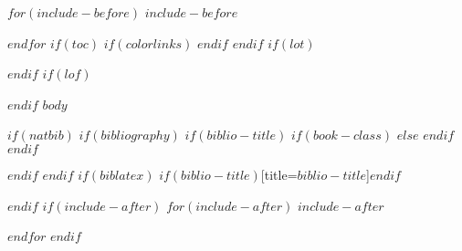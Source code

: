 \documentclass[$if(fontsize)$$fontsize$,$endif$$if(lang)$$babel-lang$,$endif$$if(papersize)$$papersize$,$endif$$for(classoption)$$classoption$$sep$,$endfor$]{$documentclass$}
\begin{document}
$for(include-before)$
$include-before$

$endfor$
$if(toc)$
{
$if(colorlinks)$
\hypersetup{linkcolor=$if(toccolor)$$toccolor$$else$black$endif$}
$endif$
\setcounter{tocdepth}{$toc-depth$}
\newpage
{}
\tableofcontents
}
$endif$
$if(lot)$
\listoftables
$endif$
$if(lof)$
\listoffigures
$endif$
$body$

$if(natbib)$
$if(bibliography)$
$if(biblio-title)$
$if(book-class)$
\renewcommand\bibname{$biblio-title$}
$else$
\renewcommand\refname{$biblio-title$}
$endif$
$endif$


$endif$
$endif$
$if(biblatex)$
\printbibliography$if(biblio-title)$[title=$biblio-title$]$endif$

$endif$
$if(include-after)$
\appendix
$for(include-after)$
$include-after$

$endfor$
$endif$
\end{document}
